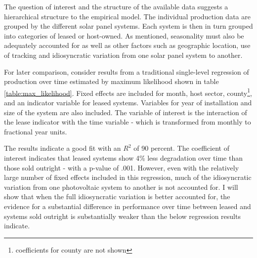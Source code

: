 \documentclass[12pt]{article}
\begin{document}
The question of interest and the structure of the available data suggests a hierarchical structure to the empirical model. The individual production data are grouped by the different solar panel systems. Each system is then in turn grouped into categories of leased or host-owned. As mentioned, seasonality must also be adequately accounted for as well as other factors such as geographic location, use of tracking and idiosyncratic variation from one solar panel system to another.

For later comparison, consider results from a traditional single-level regression of production over time estimated by maximum likelihood shown in table \ref{table:max_likelihood}. Fixed effects are included for month, host sector, county\footnote{coefficients for county are not shown}, and an indicator variable for leased systems. Variables for year of installation and size of the system are also included. The variable of interest is the interaction of the lease indicator with the time variable - which is transformed from monthly to fractional year units.

The results indicate a good fit with an $R^2$ of 90 percent. The coefficient of interest indicates that leased systems show 4\% less degradation over time than those sold outright - with a p-value of .001. However, even with the relatively large number of fixed effects included in this regression, much of the idiosyncratic variation from one photovoltaic system to another is not accounted for. I will show that when the full idiosyncratic variation is better accounted for, the evidence for a substantial difference in performance over time between leased and systems sold outright is substantially weaker than the below regression results indicate.
\end{document}
